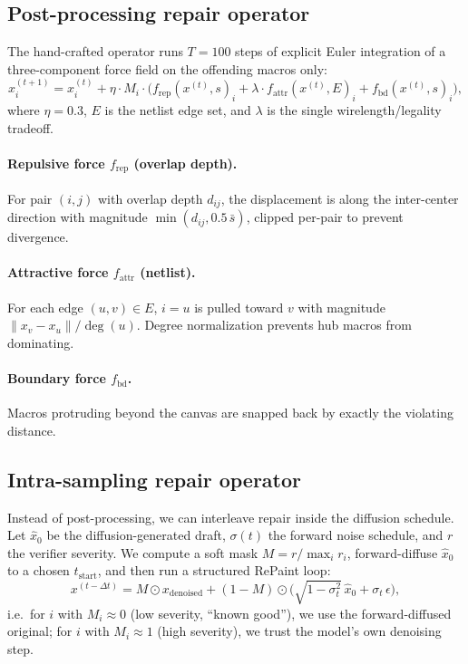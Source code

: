 \documentclass{article}
\begin{document}
\subsection{Post-processing repair operator}
\label{sec:handcrafted}

The hand-crafted operator runs $T=100$ steps of explicit Euler integration of
a three-component force field on the offending macros only:
\begin{equation}
x^{(t+1)}_i = x^{(t)}_i + \eta \cdot M_i \cdot \big(
f_{\text{rep}}(x^{(t)}, s)_i + \lambda \cdot f_{\text{attr}}(x^{(t)}, E)_i +
f_{\text{bd}}(x^{(t)}, s)_i \big),
\end{equation}
where $\eta = 0.3$, $E$ is the netlist edge set, and $\lambda$ is the single
wirelength/legality tradeoff.

\paragraph{Repulsive force $f_{\text{rep}}$ (overlap depth).}  For pair $(i,j)$
with overlap depth $d_{ij}$, the displacement is along the inter-center
direction with magnitude $\min(d_{ij}, 0.5\,\bar{s})$, clipped per-pair to
prevent divergence.

\paragraph{Attractive force $f_{\text{attr}}$ (netlist).}  For each edge
$(u,v) \in E$, $i=u$ is pulled toward $v$ with magnitude
$\|x_v - x_u\|/\deg(u)$.  Degree normalization prevents hub macros from
dominating.

\paragraph{Boundary force $f_{\text{bd}}$.}  Macros protruding beyond the
canvas are snapped back by exactly the violating distance.

\subsection{Intra-sampling repair operator}
\label{sec:intra}

Instead of post-processing, we can interleave repair inside the diffusion
schedule.  Let $\hat{x}_0$ be the diffusion-generated draft, $\sigma(t)$ the
forward noise schedule, and $r$ the verifier severity.  We compute a soft mask
$M = r / \max_i r_i$, forward-diffuse $\hat{x}_0$ to a chosen
$t_{\text{start}}$, and then run a structured RePaint loop:
\begin{equation}
x^{(t-\Delta t)} = M \odot x_{\text{denoised}} + (1-M) \odot
\big(\sqrt{1-\sigma_{t}^2}\, \hat{x}_0 + \sigma_{t}\,\epsilon\big),
\end{equation}
i.e.\ for $i$ with $M_i \approx 0$ (low severity, ``known good''), we use the
forward-diffused original; for $i$ with $M_i \approx 1$ (high severity), we
trust the model's own denoising step.
\end{document}

